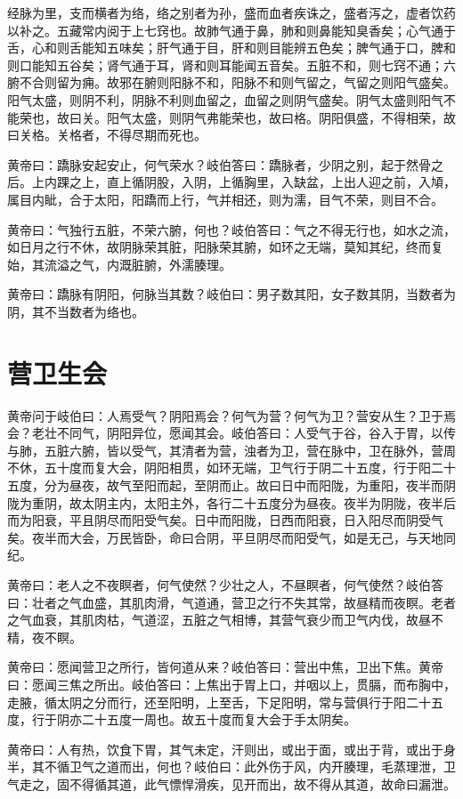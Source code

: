 \documentclass[a4paper,12pt,UTF8,twoside]{ctexbook}
\begin{document}
	经脉为里，支而横者为络，络之别者为孙，盛而血者疾诛之，盛者泻之，虚者饮药以补之。五藏常内阅于上七窍也。故肺气通于鼻，肺和则鼻能知臭香矣；心气通于舌，心和则舌能知五味矣；肝气通于目，肝和则目能辨五色矣；脾气通于口，脾和则口能知五谷矣；肾气通于耳，肾和则耳能闻五音矣。五脏不和，则七窍不通；六腑不合则留为痈。故邪在腑则阳脉不和，阳脉不和则气留之，气留之则阳气盛矣。阳气太盛，则阴不利，阴脉不利则血留之，血留之则阴气盛矣。阴气太盛则阳气不能荣也，故曰关。阳气太盛，则阴气弗能荣也，故曰格。阴阳俱盛，不得相荣，故曰关格。关格者，不得尽期而死也。
	
	黄帝曰：蹻脉安起安止，何气荣水？岐伯答曰：蹻脉者，少阴之别，起于然骨之后。上内踝之上，直上循阴股，入阴，上循胸里，入缺盆，上出人迎之前，入頄，属目内眦，合于太阳，阳蹻而上行，气并相还，则为濡，目气不荣，则目不合。
	
	黄帝曰：气独行五脏，不荣六腑，何也？岐伯答曰：气之不得无行也，如水之流，如日月之行不休，故阴脉荣其脏，阳脉荣其腑，如环之无端，莫知其纪，终而复始，其流溢之气，内溉脏腑，外濡腠理。
	
	黄帝曰：蹻脉有阴阳，何脉当其数？岐伯曰：男子数其阳，女子数其阴，当数者为阴，其不当数者为络也。
	\chapter{营卫生会}
	
	黄帝问于岐伯曰：人焉受气？阴阳焉会？何气为营？何气为卫？营安从生？卫于焉会？老壮不同气，阴阳异位，愿闻其会。岐伯答曰：人受气于谷，谷入于胃，以传与肺，五脏六腑，皆以受气，其清者为营，浊者为卫，营在脉中，卫在脉外，营周不休，五十度而复大会，阴阳相贯，如环无端，卫气行于阴二十五度，行于阳二十五度，分为昼夜，故气至阳而起，至阴而止。故曰日中而阳陇，为重阳，夜半而阴陇为重阴，故太阴主内，太阳主外，各行二十五度分为昼夜。夜半为阴陇，夜半后而为阳衰，平且阴尽而阳受气矣。日中而阳陇，日西而阳衰，日入阳尽而阴受气矣。夜半而大会，万民皆卧，命曰合阴，平旦阴尽而阳受气，如是无己，与天地同纪。
	
	黄帝曰：老人之不夜瞑者，何气使然？少壮之人，不昼瞑者，何气使然？岐伯答曰：壮者之气血盛，其肌肉滑，气道通，营卫之行不失其常，故昼精而夜瞑。老者之气血衰，其肌肉枯，气道涩，五脏之气相博，其营气衰少而卫气内伐，故昼不精，夜不瞑。
	
	黄帝曰：愿闻营卫之所行，皆何道从来？岐伯答曰：营出中焦，卫出下焦。黄帝曰：愿闻三焦之所出。岐伯答曰：上焦出于胃上口，并咽以上，贯膈，而布胸中，走腋，循太阴之分而行，还至阳明，上至舌，下足阳明，常与营俱行于阳二十五度，行于阴亦二十五度一周也。故五十度而复大会于手太阴矣。
	
	黄帝曰：人有热，饮食下胃，其气未定，汗则出，或出于面，或出于背，或出于身半，其不循卫气之道而出，何也？岐伯曰：此外伤于风，内开腠理，毛蒸理泄，卫气走之，固不得循其道，此气慓悍滑疾，见开而出，故不得从其道，故命曰漏泄。
	
\end{document}
